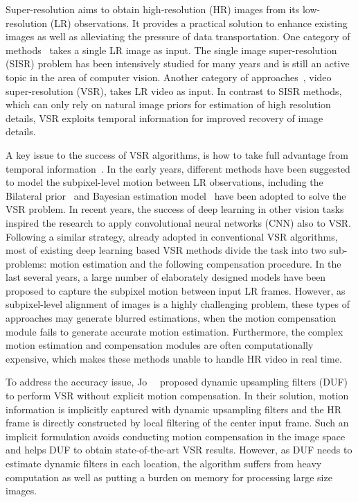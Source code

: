 \documentclass[10pt,twocolumn,letterpaper]{article}
\begin{document}
Super-resolution aims to obtain high-resolution (HR) images from its low-resolution (LR) observations.
It provides a practical solution to enhance existing images as well as alleviating the pressure of data transportation.
One category of methods~\cite{srcnn, vdsr, srgan, edsr, pyramid, back_proj} takes a single LR image as input. The single image super-resolution (SISR) problem has been intensively studied for many years and is still an active topic in the area of computer vision.
Another category of approaches~\cite{hyun2018spatio, frvsr, duf, uhd_sparse, borsoi_robust, multi_mem}, \ie video super-resolution (VSR), takes LR video as input.
In contrast to SISR methods, which can only rely on natural image priors for estimation of high resolution details,
VSR exploits temporal information for improved recovery of image details.


A key issue to the success of VSR algorithms, is how to take full advantage from temporal information~\cite{vsroverview}.
In the early years, different methods have been suggested to model the subpixel-level motion between LR observations, including the Bilateral prior~\cite{farsiu} and Bayesian estimation model~\cite{bayes} have been adopted to solve the VSR problem.
In recent years, the success of deep learning in other vision tasks inspired the research to apply convolutional neural networks (CNN) also to VSR.
Following a similar strategy, already adopted in conventional VSR algorithms, most of existing deep learning based VSR methods divide the task into two sub-problems: motion estimation and the following compensation procedure.
In the last several years, a large number of elaborately designed models have been proposed to capture the subpixel motion between input LR frames.
However, as subpixel-level alignment of images is a highly challenging problem, these types of approaches may generate blurred estimations, when the motion compensation module fails to generate accurate motion estimation.
Furthermore, the complex motion estimation and compensation modules are often computationally expensive, which makes these methods unable to handle HR video in real time.

To address the accuracy issue, Jo~\etal~\cite{duf} proposed dynamic upsampling filters (DUF) to perform VSR without explicit motion compensation.
In their solution, motion information is implicitly captured with dynamic upsampling filters and the HR frame is directly constructed by local filtering of the center input frame.
Such an implicit formulation avoids conducting motion compensation in the image space and helps DUF to obtain state-of-the-art VSR results.
However, as DUF needs to estimate dynamic filters in each location, the algorithm suffers from heavy computation as well as putting a burden on memory for processing large size images.
\end{document}
